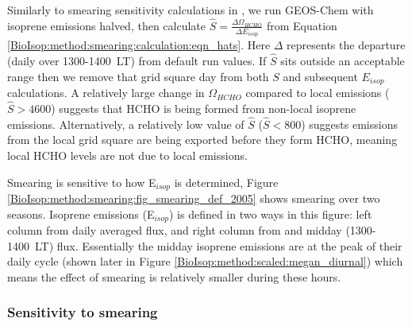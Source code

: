       
      Similarly to smearing sensitivity calculations in \textcite{Marais2012}, we run GEOS-Chem with isoprene emissions halved, then calculate $\hat{S} = \frac{\Delta \Omega_{HCHO}}{\Delta E_{isop}} $ from Equation \ref{BioIsop:method:smearing:calculation:eqn_hats}.
      Here $\Delta$ represents the departure (daily over 1300-1400~LT) from default run values.
      If $\hat{S}$ sits outside an acceptable range then we remove that grid square day from both $S$ and subsequent $E_{isop}$ calculations.
      A relatively large change in $\Omega_{HCHO}$ compared to local emissions ($\hat{S}>4600$) suggests that HCHO is being formed from non-local isoprene emissions.
      Alternatively, a relatively low value of $\hat{S}$ ($\hat{S}<800$) suggests emissions from the local grid square are being exported before they form HCHO, meaning local HCHO levels are not due to local emissions.
      
      Smearing is sensitive to how E$_{isop}$ is determined, Figure \ref{BioIsop:method:smearing:fig_smearing_def_2005} shows smearing over two seasons.
      Isoprene emissions (E$_{isop}$) is defined in two ways in this figure: left column from daily averaged flux, and right column from and midday (1300-1400~LT) flux. 
      Essentially the midday isoprene emissions are at the peak of their daily cycle (shown later in Figure \ref{BioIsop:method:scaled:megan_diurnal}) which means the effect of smearing is relatively smaller during these hours.
      
      
      
      

    \subsubsection{Sensitivity to smearing}
    
